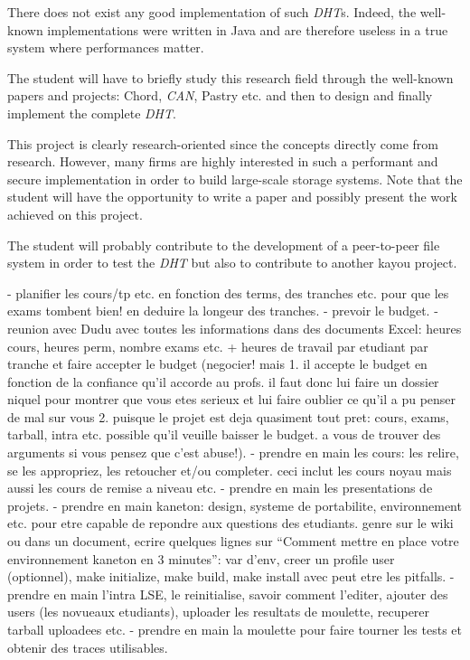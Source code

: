 \begin{multicols}{2}
There does not exist any good implementation of such \textit{DHT}s. Indeed,
the well-known implementations were written in Java and are therefore
useless in a true system where performances matter.

The student will have to briefly study this research field through the
well-known papers and projects: Chord, \textit{CAN}, Pastry etc. and then
to design and finally implement the complete \textit{DHT}.

This project is clearly research-oriented since the concepts directly come
from research. However, many firms are highly interested in such a
performant and secure implementation in order to build large-scale storage
systems. Note that the student will have the opportunity to write a paper and
possibly present the work achieved on this project.

The student will probably contribute to the development of a peer-to-peer
file system in order to test the \textit{DHT} but also to contribute to
another kayou project.

\end{multicols}



%
%

- planifier les cours/tp etc. en fonction des terms, des tranches etc.
  pour que les exams tombent bien! en deduire la longeur des tranches.
- prevoir le budget.
- reunion avec Dudu avec toutes les informations dans des documents Excel:
  heures cours, heures perm, nombre exams etc. + heures de travail par etudiant
  par tranche et faire accepter le budget (negocier! mais 1. il accepte le
  budget en fonction de la confiance qu'il accorde au profs. il faut donc
  lui faire un dossier niquel pour montrer que vous etes serieux et lui
  faire oublier ce qu'il a pu penser de mal sur vous 2. puisque le projet
  est deja quasiment tout pret: cours, exams, tarball, intra etc. possible
  qu'il veuille baisser le budget. a vous de trouver des arguments si vous
  pensez que c'est abuse!).
- prendre en main les cours: les relire, se les appropriez, les retoucher
  et/ou completer. ceci inclut les cours noyau mais aussi les cours de remise
  a niveau etc.
- prendre en main les presentations de projets.
- prendre en main kaneton: design, systeme de portabilite, environnement etc.
  pour etre capable de repondre aux questions des etudiants.
  genre sur le wiki ou dans un document, ecrire quelques lignes sur ``Comment
  mettre en place votre environnement kaneton en 3 minutes'': var d'env,
  creer un profile user (optionnel), make initialize, make build, make install
  avec peut etre les pitfalls.
- prendre en main l'intra LSE, le reinitialise, savoir comment l'editer,
  ajouter des users (les novueaux etudiants), uploader les resultats de
  moulette, recuperer tarball uploadees etc.
- prendre en main la moulette pour faire tourner les tests et obtenir des
  traces utilisables.

